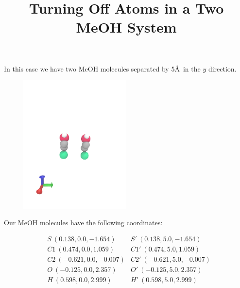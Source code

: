 \documentclass{article}\usepackage[]{graphicx}\usepackage[]{color}
\begin{document}
\title{Turning Off Atoms in a Two MeOH System}
\maketitle

In this case we have two MeOH molecules separated by 5\AA\ in the $y$ direction.

\begin{figure}[H]
  \center
  \includegraphics[trim=0 0 0 300,clip,width=0.5\textwidth]{two_meoh}
\end{figure}

Our MeOH molecules have the following coordinates:

\begin{align*}
  &S\ (0.138,0.0,-1.654)   &S'\ (0.138,5.0,-1.654)\\
  &C1\ (0.474,0.0,1.059)   &C1'\ (0.474,5.0,1.059)\\
  &C2\ (-0.621,0.0,-0.007) &C2'\ (-0.621,5.0,-0.007)\\
  &O\ (-0.125,0.0,2.357)   &O'\ (-0.125,5.0,2.357)\\
  &H\ (0.598,0.0,2.999)    &H'\ (0.598,5.0,2.999)\\
\end{align*}
\end{document}
